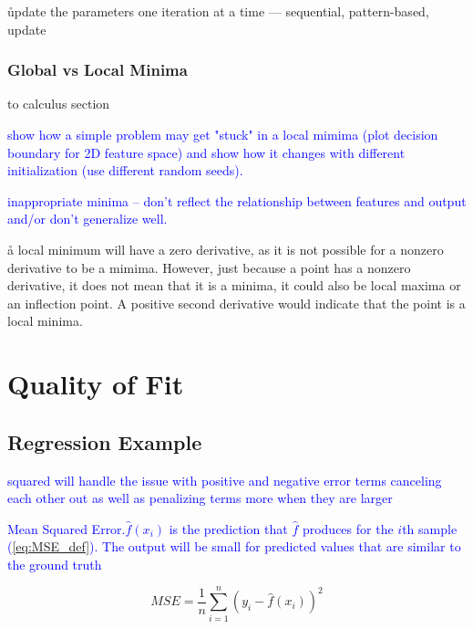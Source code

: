 \r{update the parameters one iteration at a time --- sequential, pattern-based, update}


\subsubsection{Global vs Local Minima}

\ALR to calculus section

\textcolor{blue}{show how a simple problem may get "stuck" in a local mimima (plot decision boundary for 2D feature space) and show how it changes with different initialization (use different random seeds). }

\textcolor{blue}{{inappropriate minima} -- don't reflect the relationship between features and output and/or don't generalize well.}

\r{a local minimum will have a zero derivative, as it is not possible for a nonzero derivative to be a mimima.  However, just because a point has a nonzero derivative, it does not mean that it is a minima, it could also be local maxima or an inflection point. A positive second derivative would indicate that the point is a local minima.}

\section{Quality of Fit}


\subsection{Regression Example}


\textcolor{blue}{squared will handle the issue with positive and negative error terms canceling each other out as well as penalizing terms more when they are larger}

\textcolor{blue}{Mean Squared Error.$\hat{f}(x_i)$ is the prediction that $\hat{f}$ produces for the $i$th sample (\ref{eq:MSE_def}). The output will be small for predicted values that are similar to the ground truth}

\begin{equation}
{MSE = \frac{1}{n}\sum_{i=1}^{n}(y_i - \hat{f}(x_i))^2}
\label{eq:MSE_def}
\end{equation}

